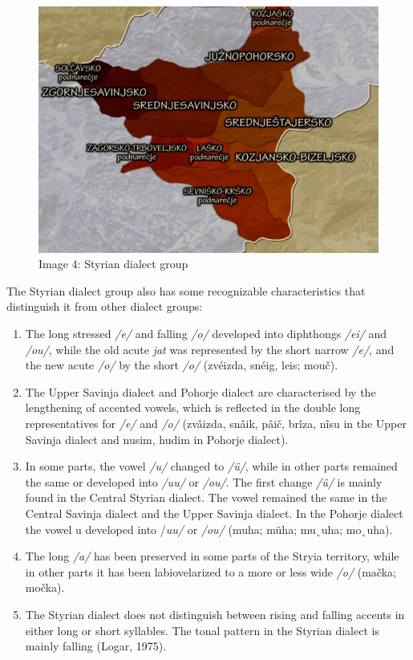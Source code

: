 \documentclass[fleqn,moreauthors,10pt]{ds_report}
\begin{document}
\begin{figure}
    \centering
    \includegraphics[width=1\linewidth]{styria.png}
    \caption{Image 4: Styrian dialect group
}
    \label{fig:map}
\end{figure}


    The Styrian dialect group also has some recognizable characteristics that distinguish it from other dialect groups: 

\begin{enumerate}
    \item The long stressed \textit{/e/} and falling \textit{/o/} developed into diphthongs \textit{/ei/} and \textit{/ou/}, while the old acute \textit{jat} was represented by the short narrow \textit{/e/}, and the new acute \textit{/o/} by the short \textit{/o/} (zvéizda, snéig, leis; mouč).

    \item The Upper Savinja dialect and Pohorje dialect are characterised by the lengthening of accented vowels, which is reflected in the double long representatives for \textit{/e/} and \textit{/o/} (zvâizda, snâik, pâič, brîza, nîsu in the Upper Savinja dialect and nusim, hudim in Pohorje dialect). 

    \item In some parts, the vowel \textit{/u/} changed to \textit{/ü/}, while in other parts remained the same or developed into \textit{/uu/} or \textit{/ou/}. The first change \textit{/ü/} is mainly found in the Central Styrian dialect. The vowel remained the same in the Central Savinja dialect and the Upper Savinja dialect. In the Pohorje dialect the vowel u developed into /\textit{uu/} or \textit{/ou/} (muha; müha; mu˛uha; mo˛uha).

    \item The long \textit{/a/} has been preserved in some parts of the Stryia territory, while in other parts it has been labiovelarized to a more or less wide \textit{/o/} (mačka; močka).

    \item The Styrian dialect does not distinguish between rising and falling accents in either long or short syllables. The tonal pattern in the Styrian dialect is mainly falling (Logar, 1975).
\end{enumerate}
\end{document}

